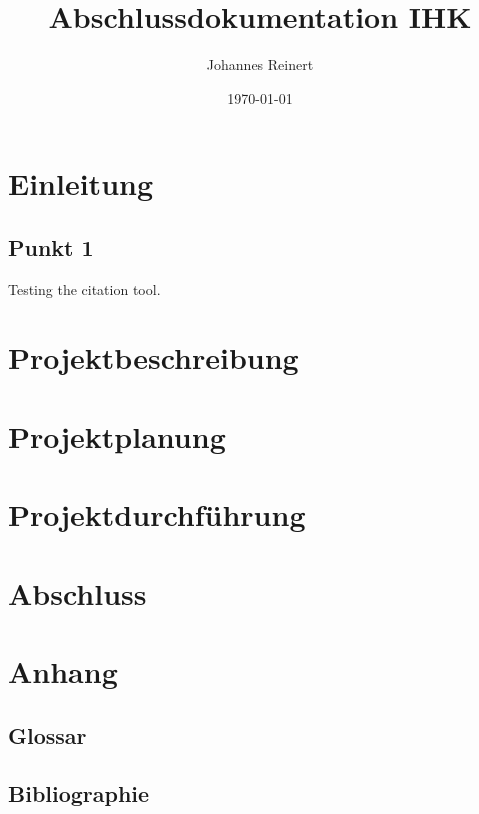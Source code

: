 \documentclass[a4paper]{article}
\title{Abschlussdokumentation IHK}
\author{Johannes Reinert}
\date{\today}
\begin{document}
\maketitle
\newpage

\tableofcontents

\newpage

\section{Einleitung}
\subsection{Punkt 1}

Testing the citation \cite{test} tool.

\section{Projektbeschreibung}

\section{Projektplanung}

\section{Projektdurchführung}

\section{Abschluss}

\section{Anhang}

\subsection{Glossar}

\subsection{Bibliographie}
\printbibliography
\end{document}
